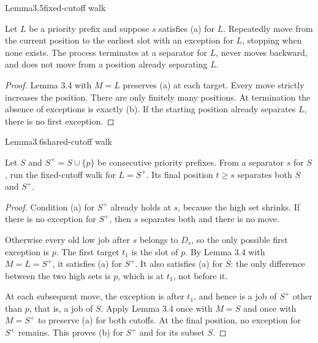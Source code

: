 \begin{numbered}{Lemma}{3.5}{fixed-cutoff walk}

Let \(L\) be a priority prefix and suppose \(s\) satisfies (a) for \(L\). Repeatedly move from the current position to the earliest slot with an exception for \(L\), stopping when none exists. The process terminates at a separator for \(L\), never moves backward, and does not move from a position already separating \(L\).

\end{numbered}

\begin{proof}
Lemma 3.4 with \(M=L\) preserves (a) at each target. Every move strictly increases the position. There are only finitely many positions. At termination the absence of exceptions is exactly (b). If the starting position already separates \(L\), there is no first exception.
\end{proof}

\begin{numbered}{Lemma}{3.6}{shared-cutoff walk}

Let \(S\) and \(S^+=S\cup\{p\}\) be consecutive priority prefixes. From a separator \(s\) for \(S\), run the fixed-cutoff walk for \(L=S^+\). Its final position \(t\geq s\) separates both \(S\) and \(S^+\).

\end{numbered}

\begin{proof}
Condition (a) for \(S^+\) already holds at \(s\), because the high set shrinks. If there is no exception for \(S^+\), then \(s\) separates both and there is no move.

Otherwise every old low job after \(s\) belongs to \(D_s\), so the only possible first exception is \(p\). The first target \(t_1\) is the slot of \(p\). By Lemma 3.4 with \(M=L=S^+\), it satisfies (a) for \(S^+\). It also satisfies (a) for \(S\): the only difference between the two high sets is \(p\), which is at \(t_1\), not before it.

At each subsequent move, the exception is after \(t_1\), and hence is a job of \(S^+\) other than \(p\), that is, a job of \(S\). Apply Lemma 3.4 once with \(M=S\) and once with \(M=S^+\) to preserve (a) for both cutoffs. At the final position, no exception for \(S^+\) remains. This proves (b) for \(S^+\) and for its subset \(S\).
\end{proof}

